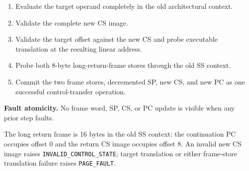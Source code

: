 \begin{enumerate}
\item Evaluate the target operand completely in the old architectural context.
\item Validate the complete new CS image.
\item Validate the target offset against the new CS and probe executable translation at the resulting linear address.
\item Probe both 8-byte long-return-frame stores through the old SS context.
\item Commit the two frame stores, decremented SP, new CS, and new PC as one successful control-transfer operation.
\end{enumerate}

\textbf{Fault atomicity.} No frame word, SP, CS, or PC update is visible when any prior step faults.

The long return frame is 16 bytes in the old SS context: the continuation PC occupies offset 0 and the return CS image
occupies offset 8. An invalid new CS image raises \texttt{INVALID\_CONTROL\_STATE}; target translation or either
frame-store translation failure raises \texttt{PAGE\_FAULT}.
